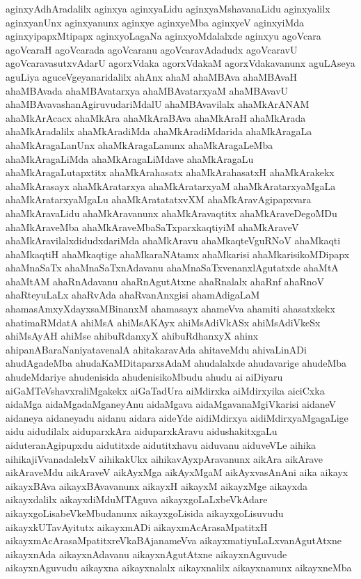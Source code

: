 {aginxyAdhAradalilx
aginxya
aginxyaLidu
aginxyaMshavanaLidu
aginxyalilx
aginxyanUnx
aginxyanunx
aginxye
aginxyeMba
aginxyeV
aginxyiMda
aginxyipapxMtipapx
aginxyoLagaNa
aginxyoMdalalxde
aginxyu
agoVcara
agoVcaraH
agoVcarada
agoVcaranu
agoVcaravAdadudx
agoVcaravU
agoVcaravasutxvAdarU
agorxVdaka
agorxVdakaM
agorxVdakavanunx
aguLAseya
aguLiya
aguceVgeyanaridalilx
ahAnx
ahaM
ahaMBAva
ahaMBAvaH
ahaMBAvada
ahaMBAvatarxya
ahaMBAvatarxyaM
ahaMBAvavU
ahaMBAvavashanAgiruvudariMdalU
ahaMBAvavilalx
ahaMkArANAM
ahaMkArAcacx
ahaMkAra
ahaMkAraBAva
ahaMkAraH
ahaMkArada
ahaMkAradalilx
ahaMkAradiMda
ahaMkAradiMdarida
ahaMkAragaLa
ahaMkAragaLanUnx
ahaMkAragaLanunx
ahaMkAragaLeMba
ahaMkAragaLiMda
ahaMkAragaLiMdave
ahaMkAragaLu
ahaMkAragaLutapxtitx
ahaMkArahasatx
ahaMkArahasatxH
ahaMkArakekx
ahaMkArasayx
ahaMkAratarxya
ahaMkAratarxyaM
ahaMkAratarxyaMgaLa
ahaMkAratarxyaMgaLu
ahaMkAratatatxvXM
ahaMkAravAgipapxvara
ahaMkAravaLidu
ahaMkAravanunx
ahaMkAravaqtitx
ahaMkAraveDegoMDu
ahaMkAraveMba
ahaMkAraveMbaSaTxparxkaqtiyiM
ahaMkAraveV
ahaMkAravilalxdidudxdariMda
ahaMkAravu
ahaMkaqteVguRNoV
ahaMkaqti
ahaMkaqtiH
ahaMkaqtige
ahaMkaraNAtamx
ahaMkarisi
ahaMkarisikoMDipapx
ahaMnaSaTx
ahaMnaSaTxnAdavanu
ahaMnaSaTxvenanxlAgutatxde
ahaMtA
ahaMtAM
ahaRnAdavanu
ahaRnAgutAtxne
ahaRnalalx
ahaRnf
ahaRnoV
ahaRteyuLaLx
ahaRvAda
ahaRvanAnxgisi
ahamAdigaLaM
ahamasAmxyXdayxsaMBinanxM
ahamasayx
ahameVva
ahamiti
ahasatxkekx
ahatimaRMdatA
ahiMsA
ahiMsAKAyx
ahiMsAdiVkASx
ahiMsAdiVkeSx
ahiMsAyAH
ahiMse
ahibuRdanxyX
ahibuRdhanxyX
ahinx
ahipanABaraNaniyatavenalA
ahitakaravAda
ahitaveMdu
ahivaLinADi
ahudAgadeMba
ahudaKaMDitaparxsAdaM
ahudalalxde
ahudavarige
ahudeMba
ahudeMdariye
ahudenisida
ahudenisikoMbudu
ahudu
ai
aiDiyaru
aiGaMTeVshavxraliMgakekx
aiGaTadUra
aiMdirxka
aiMdirxyika
aiciCxka
aidaMga
aidaMgadaMganeyAnu
aidaMgava
aidaMgavanaMgiVkarisi
aidaneV
aidaneya
aidaneyadu
aidanu
aidara
aideYde
aidiMdirxya
aidiMdirxyaMgagaLige
aidu
aidudilalx
aiduparxkAra
aiduparxkAravu
aidushakitxgaLu
aiduteranAgipupxdu
aidutitxde
aidutitxhavu
aiduvanu
aiduveVLe
aihika
aihikajiVvanadalelxV
aihikakUkx
aihikavAyxpAravanunx
aikAra
aikArave
aikAraveMdu
aikAraveV
aikAyxMga
aikAyxMgaM
aikAyxvasAnAni
aika
aikayx
aikayxBAva
aikayxBAvavanunx
aikayxH
aikayxM
aikayxMge
aikayxda
aikayxdalilx
aikayxdiMduMTAguva
aikayxgoLaLxbeVkAdare
aikayxgoLisabeVkeMbudanunx
aikayxgoLisida
aikayxgoLisuvudu
aikayxkUTavAyitutx
aikayxmADi
aikayxmAcArasaMpatitxH
aikayxmAcArasaMpatitxreVkaBAjanameVva
aikayxmatiyuLaLxvanAgutAtxne
aikayxnAda
aikayxnAdavanu
aikayxnAgutAtxne
aikayxnAguvude
aikayxnAguvudu
aikayxna
aikayxnalalx
aikayxnalilx
aikayxnanunx
aikayxneMba
}
